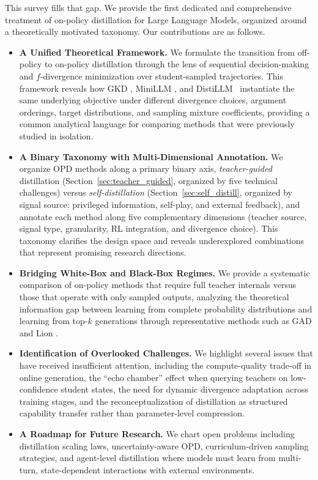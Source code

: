 \documentclass{article} %
\begin{document}
This survey fills that gap. We provide the first dedicated and comprehensive treatment of on-policy distillation for Large Language Models, organized around a theoretically motivated taxonomy. Our contributions are as follows.
\begin{itemize}
    \item \textbf{A Unified Theoretical Framework.} We formulate the transition from off-policy to on-policy distillation through the lens of sequential decision-making and $f$-divergence minimization over student-sampled trajectories. This framework reveals how GKD \citep{2306.13649}, MiniLLM \citep{2306.08543}, and DistiLLM~\citep{2402.03898} instantiate the same underlying objective under different divergence choices, argument orderings, target distributions, and sampling mixture coefficients, providing a common analytical language for comparing methods that were previously studied in isolation.
    \item \textbf{A Binary Taxonomy with Multi-Dimensional Annotation.} We organize OPD methods along a primary binary axis, \textit{teacher-guided} distillation (Section~\ref{sec:teacher_guided}, organized by five technical challenges) versus \textit{self-distillation} (Section~\ref{sec:self_distill}, organized by signal source: privileged information, self-play, and external feedback), and annotate each method along five complementary dimensions (teacher source, signal type, granularity, RL integration, and divergence choice). This taxonomy clarifies the design space and reveals underexplored combinations that represent promising research directions.
    \item \textbf{Bridging White-Box and Black-Box Regimes.} We provide a systematic comparison of on-policy methods that require full teacher internals versus those that operate with only sampled outputs, analyzing the theoretical information gap between learning from complete probability distributions and learning from top-$k$ generations through representative methods such as GAD \citep{2511.10643} and Lion \citep{2305.12870}.
    \item \textbf{Identification of Overlooked Challenges.} We highlight several issues that have received insufficient attention, including the compute-quality trade-off in online generation, the ``echo chamber'' effect when querying teachers on low-confidence student states, the need for dynamic divergence adaptation across training stages, and the reconceptualization of distillation as structured capability transfer rather than parameter-level compression.
    \item \textbf{A Roadmap for Future Research.} We chart open problems including distillation scaling laws, uncertainty-aware OPD, curriculum-driven sampling strategies, and agent-level distillation where models must learn from multi-turn, state-dependent interactions with external environments.
\end{itemize}
\end{document}
